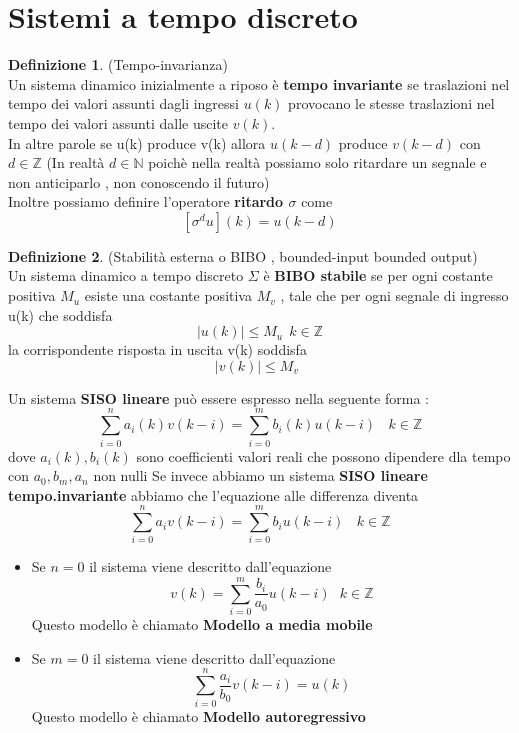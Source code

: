 \documentclass{article}
\theoremstyle{definition}
\newtheorem*{definizione}{Definizione}
\newcommand{\sisdiscr}{\sum_{i=0}^n a_iv(k-i)=\sum_{i=0}^m b_iu(k-i) \ \ \ \ k \in \mathbb{Z}}
\begin{document}
	\section{Sistemi a tempo discreto}
	\begin{definizione}(Tempo-invarianza)\\
		Un sistema dinamico inizialmente a riposo è \textbf{tempo invariante} se traslazioni nel tempo dei valori assunti dagli ingressi $u(k)$ provocano le stesse traslazioni nel tempo dei valori assunti dalle uscite $v(k)$.\\
		In altre parole se u(k) produce v(k) allora $u(k-d)$ produce $v(k-d)$ con $d \in \mathbb{Z}$ (In realtà $d \in \mathbb{N}$ poichè nella realtà possiamo solo ritardare un segnale e non anticiparlo , non conoscendo il futuro)\\
		Inoltre possiamo definire l'operatore \textbf{ritardo $\sigma$ } come 
		$$[\sigma^d u](k)=u(k-d)$$
			\end{definizione}
	\begin{definizione}(Stabilità esterna o BIBO , bounded-input bounded output)\\
		Un sistema dinamico a tempo discreto $\Sigma$ è \textbf{BIBO stabile }se per ogni costante positiva $M_u$ esiste una costante positiva $M_v$ , tale che per ogni segnale di ingresso u(k) che soddisfa 
		$$|u(k)|\leq M_u \ \  k \in \mathbb{Z}$$
		la corrispondente risposta in uscita v(k) soddisfa
		$$|v(k)|\leq M_v \ \  \textbf{} $$
	\end{definizione}
	Un sistema \textbf{SISO lineare} può essere espresso nella seguente forma : 
	$$\sum_{i=0}^n a_i(k)v(k-i)=\sum_{i=0}^m b_i(k)u(k-i) \ \ \ \ k \in \mathbb{Z}$$
	dove $a_i(k),b_i(k)$ sono coefficienti  valori reali che possono dipendere dla tempo con $a_0,b_m,a_n$ non nulli
	Se invece abbiamo un sistema \textbf{SISO lineare tempo.invariante} abbiamo che l'equazione alle differenza diventa 
	$$\sisdiscr$$
	\begin{itemize}
		\item Se $n=0$ il sistema viene descritto dall'equazione 
		$$v(k)=\sum_{i=0}^{m}\frac{b_i}{a_0}u(k-i)  \ \ \ k \in \mathbb{Z}$$
		Questo modello è chiamato \textbf{Modello a media mobile}
		\item Se $m=0$ il sistema viene descritto dall'equazione
		$$\sum_{i=0}^{n}\frac{a_i}{b_0}v(k-i)=u(k)$$
		Questo modello è chiamato \textbf{Modello autoregressivo}
	\end{itemize}
 
\end{document}
